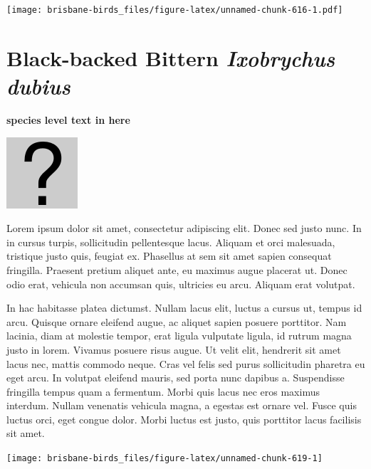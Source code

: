 \documentclass[]{book}
\let\origfigure\figure
\let\endorigfigure\endfigure
\renewenvironment{figure}[1][2] {
  \expandafter\origfigure\expandafter[H]
} {
  \endorigfigure
}
\begin{document}
\begin{figure}
\centering
\texttt{[image: brisbane-birds\_files/figure-latex/unnamed-chunk-616-1.pdf]}
\caption{\label{fig:unnamed-chunk-616}insert figure caption}
\end{figure}

\section{\texorpdfstring{Black-backed Bittern \emph{Ixobrychus
dubius}}{Black-backed Bittern Ixobrychus dubius}}\label{black-backed-bittern-ixobrychus-dubius}

\textbf{species level text in here}

\begin{figure}
\centering
\includegraphics{assets/missing.png}
\caption{No image for species}
\end{figure}

Lorem ipsum dolor sit amet, consectetur adipiscing elit. Donec sed justo
nunc. In in cursus turpis, sollicitudin pellentesque lacus. Aliquam et
orci malesuada, tristique justo quis, feugiat ex. Phasellus at sem sit
amet sapien consequat fringilla. Praesent pretium aliquet ante, eu
maximus augue placerat ut. Donec odio erat, vehicula non accumsan quis,
ultricies eu arcu. Aliquam erat volutpat.

In hac habitasse platea dictumst. Nullam lacus elit, luctus a cursus ut,
tempus id arcu. Quisque ornare eleifend augue, ac aliquet sapien posuere
porttitor. Nam lacinia, diam at molestie tempor, erat ligula vulputate
ligula, id rutrum magna justo in lorem. Vivamus posuere risus augue. Ut
velit elit, hendrerit sit amet lacus nec, mattis commodo neque. Cras vel
felis sed purus sollicitudin pharetra eu eget arcu. In volutpat eleifend
mauris, sed porta nunc dapibus a. Suspendisse fringilla tempus quam a
fermentum. Morbi quis lacus nec eros maximus interdum. Nullam venenatis
vehicula magna, a egestas est ornare vel. Fusce quis luctus orci, eget
congue dolor. Morbi luctus est justo, quis porttitor lacus facilisis sit
amet.

\begin{figure}
\texttt{[image: brisbane-birds\_files/figure-latex/unnamed-chunk-619-1]} \caption{insert figure caption}\label{fig:unnamed-chunk-619}
\end{figure}
\end{document}

